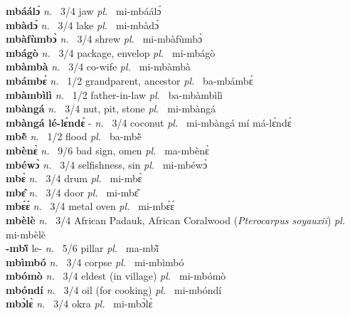 \noindent
{\bfseries mbáálɔ́}  {\itshape n.~} 3/4 jaw {\itshape pl.~} mi-mbáálɔ́    \\ 
{\bfseries mbàdɔ́}  {\itshape n.~} 3/4 lake {\itshape pl.~} mi-mbàdɔ́    \\ 
{\bfseries mbàfùmbɔ̀}  {\itshape n.~} 3/4 shrew  {\itshape pl.~} mi-mbàfùmbɔ̀    \\ 
{\bfseries mbágò}  {\itshape n.~} 3/4 package, envelop {\itshape pl.~} mi-mbágò    \\ 
{\bfseries mbàmbà}  {\itshape n.~} 3/4 co-wife {\itshape pl.~} mi-mbàmbà    \\ 
{\bfseries mbámbɛ́}  {\itshape n.~} 1/2 grandparent, ancestor {\itshape pl.~} ba-mbámbɛ́    \\ 
{\bfseries mbàmbìlì}  {\itshape n.~} 1/2 father-in-law {\itshape pl.~} ba-mbàmbìlì    \\ 
{\bfseries mbàngá}  {\itshape n.~} 3/4 nut, pit, stone {\itshape pl.~} mi-mbàngá    \\ 
{\bfseries mbàngá lé-lɛ́ndɛ́} - {\itshape n.~} 3/4 coconut {\itshape pl.~} mi-mbàngá mí má-lɛ́ndɛ́    \\ 
{\bfseries mbẽ̀}  {\itshape n.~} 1/2 flood {\itshape pl.~} ba-mbẽ̀    \\ 
{\bfseries mbènɛ̀}  {\itshape n.~} 9/6  bad sign, omen {\itshape pl.~} ma-mbènɛ̀    \\ 
{\bfseries mbéwɔ̀}  {\itshape n.~} 3/4 selfishness, sin {\itshape pl.~} mi-mbéwɔ̀    \\ 
{\bfseries mbɛ̀}  {\itshape n.~} 3/4 drum {\itshape pl.~} mi-mbɛ̀    \\ 
{\bfseries mbɛ̂}  {\itshape n.~} 3/4 door {\itshape pl.~} mi-mbɛ̂    \\ 
{\bfseries mbɛ́ɛ́}  {\itshape n.~} 3/4 metal oven {\itshape pl.~} mi-mbɛ́ɛ́    \\ 
{\bfseries mbèlè}  {\itshape n.~} 3/4 African Padauk, African Coralwood ({\itshape Pterocarpus soyauxii}) {\itshape pl.~} mi-mbèlè    \\ 
{\bfseries -mbĩ̀} le- {\itshape n.~} 5/6 pillar {\itshape pl.~} ma-mbĩ̀    \\ 
{\bfseries mbìmbó}  {\itshape n.~} 3/4 corpse {\itshape pl.~} mi-mbìmbó    \\ 
{\bfseries mbómò}  {\itshape n.~} 3/4 eldest (in village) {\itshape pl.~} mi-mbómò    \\ 
{\bfseries mbóndí}  {\itshape n.~} 3/4 oil (for cooking) {\itshape pl.~} mi-mbóndí    \\ 
{\bfseries mbɔ̀lɛ̀}  {\itshape n.~} 3/4 okra {\itshape pl.~} mi-mbɔ̀lɛ̀    \\ 
